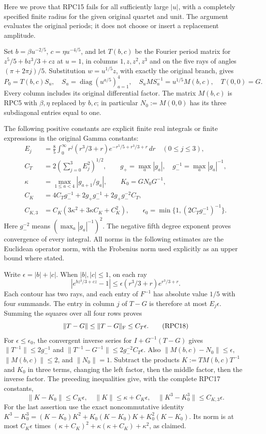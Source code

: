 Here we prove that RPC15 fails for all sufficiently large $|u|$,
with a completely specified finite radius for the given original
quartet and unit. The argument evaluates the original periods; it
does not choose or insert a replacement amplitude.

Set $b=\beta u^{-2/5}$, $c=\eta u^{-4/5}$, and let $T(b,c)$
be the Fourier period matrix for
$z^5/5+bz^3/3+cz$ at $u=1$, in columns $1,z,z^2,z^3$ and on
the five rays of angles $(\pi+2\pi j)/5$. Substitution
$w=u^{1/5}z$, with exactly the original branch, gives
\[
 P_0=T(b,c)S_u,\quad S_u=\operatorname{diag}(u^{a/5})_{a=1}^4,
 \quad S_uMS_u^{-1}=u^{1/5}M(b,c),\quad T(0,0)=G.
 \tag{RPC16}
\]
Every column includes its original differential factor. The matrix
$M(b,c)$ is RPC5 with $\beta,\eta$ replaced by $b,c$; in particular
$N_0:=M(0,0)$ has its three subdiagonal entries equal to one.

The following positive constants are explicit finite real integrals
or finite expressions in the original Gamma constants:
\[
 \begin{split}
 E_j&=\frac85\int_0^\infty r^j(r^3/3+r)
                    e^{-r^5/5+r^3/3+r}\,dr\quad(0\le j\le3),\\
 C_T&=2\left(\sum_{j=0}^3E_j^2\right)^{1/2},\qquad
 g_+=\max_a|g_a|,\quad g_-^{-1}=\max_a|g_a|^{-1},\\
 \kappa&=\max_{1\le a<4}|g_{a+1}/g_a|,\qquad
 K_0=GN_0G^{-1},\\
 C_K&=4C_Tg_-^{-1}+2g_+g_-^{-1}
                       +2g_+g_-^{-2}C_T,\\
 C_{K,3}&=C_K(3\kappa^2+3\kappa C_K+C_K^2),\qquad
 \epsilon_0=\min\{1,(2C_Tg_-^{-1})^{-1}\}.
 \end{split}
 \tag{RPC17}
\]
Here $g_-^{-2}$ means $(\max_a|g_a|^{-1})^2$. The negative fifth
degree exponent proves convergence of every integral. All norms in
the following estimates are the Euclidean operator norm, with the
Frobenius norm used explicitly as an upper bound where stated.

Write $\epsilon=|b|+|c|$. When $|b|,|c|\le1$, on each ray
\[
 |e^{bz^3/3+cz}-1|
 \le \epsilon(r^3/3+r)e^{r^3/3+r}.
\]
Each contour has two rays, and each entry of $F^{-1}$ has absolute
value $1/5$ with four summands. The entry in column $j$ of
$T-G$ is therefore at most $E_j\epsilon$. Summing the squares
over all four rows proves
\[
 \|T-G\|\le\|T-G\|_{\rm F}\le C_T\epsilon.
 \tag{RPC18}
\]
For $\epsilon\le\epsilon_0$, the convergent inverse series for
$I+G^{-1}(T-G)$ gives
$\|T^{-1}\|\le2g_-^{-1}$ and
$\|T^{-1}-G^{-1}\|\le2g_-^{-2}C_T\epsilon$.
Also $\|M(b,c)-N_0\|\le\epsilon$, $\|M(b,c)\|\le2$,
and $\|N_0\|=1$. Subtract the products
$K:=T M(b,c)T^{-1}$ and $K_0$ in three terms, changing the left
factor, then the middle factor, then the inverse factor. The preceding
inequalities give, with the complete RPC17 constants,
\[
 \|K-K_0\|\le C_K\epsilon,\quad
 \|K\|\le\kappa+C_K\epsilon,\quad
 \|K^3-K_0^3\|\le C_{K,3}\epsilon.
 \tag{RPC19}
\]
For the last assertion use the exact noncommutative identity
$K^3-K_0^3=(K-K_0)K^2+K_0(K-K_0)K+K_0^2(K-K_0)$.
Its norm is at most $C_K\epsilon$ times
$(\kappa+C_K)^2+\kappa(\kappa+C_K)+\kappa^2$, as claimed.

